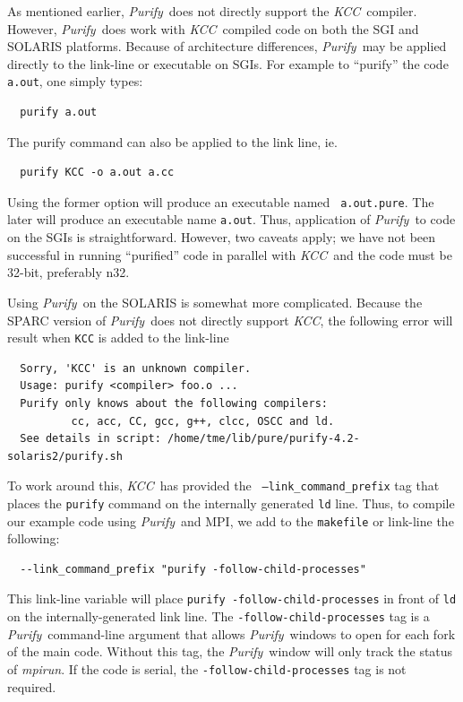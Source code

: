 \documentclass[11pt]{../tex/nmemo}
\newcommand{\purify}{\textsl{Purify}}
\newcommand{\KCC}{\textsl{KCC}}
\newcommand{\dir}[1]{\textsl{#1}}
\begin{document}
As mentioned earlier, \purify\ does not directly support the \KCC\ 
compiler.  However, \purify\ does work with \KCC\ compiled code on
both the SGI and SOLARIS platforms.  Because of architecture
differences, \purify\ may be applied directly to the link-line or
executable on SGIs.  For example to ``purify'' the code {\tt a.out},
one simply types:
\begin{verbatim}
  purify a.out
\end{verbatim}
The purify command can also be applied to the link line, ie.
\begin{verbatim}
  purify KCC -o a.out a.cc
\end{verbatim}
Using the former option will produce an executable named {\tt
  a.out.pure}.  The later will produce an executable name {\tt a.out}.
Thus, application of \purify\ to code on the SGIs is straightforward.
However, two caveats apply; we have not been successful in running
``purified'' code in parallel with \KCC\, and the code must be 32-bit,
preferably n32.

Using \purify\ on the SOLARIS is somewhat more complicated.  Because
the SPARC version of \purify\ does not directly support \KCC, the
following error will result when {\tt KCC} is added to the link-line
\begin{verbatim}
  Sorry, 'KCC' is an unknown compiler.
  Usage: purify <compiler> foo.o ...
  Purify only knows about the following compilers:
          cc, acc, CC, gcc, g++, clcc, OSCC and ld.
  See details in script: /home/tme/lib/pure/purify-4.2-solaris2/purify.sh
\end{verbatim}
To work around this, \KCC\ has provided the {\tt
  --link\_command\_prefix} tag that places the {\tt purify} command on
the internally generated {\tt ld} line.  Thus, to compile our example
code using \purify\ and MPI, we add to the {\tt makefile} or link-line 
the following:
\begin{verbatim}
  --link_command_prefix "purify -follow-child-processes"
\end{verbatim}
This link-line variable will place {\tt purify
  -follow-child-processes} in front of {\tt ld} on the
internally-generated link line.  The {\tt -follow-child-processes} tag 
is a \purify\ command-line argument that allows \purify\ windows to
open for each fork of the main code.  Without this tag, the \purify\
window will only track the status of \dir{mpirun}.  If the code is
serial, the {\tt -follow-child-processes} tag is not required.
\end{document}
